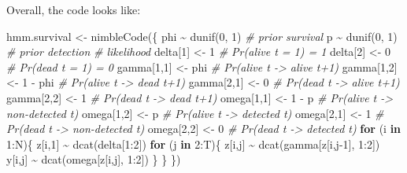 \documentclass[
  12pt,
]{krantz}
\newenvironment{Shaded}{\begin{snugshade}}{\end{snugshade}}
\newcommand{\CommentTok}[1]{\textcolor[rgb]{0.56,0.35,0.01}{\textit{#1}}}
\newcommand{\ControlFlowTok}[1]{\textcolor[rgb]{0.13,0.29,0.53}{\textbf{#1}}}
\newcommand{\DecValTok}[1]{\textcolor[rgb]{0.00,0.00,0.81}{#1}}
\newcommand{\FunctionTok}[1]{\textcolor[rgb]{0.00,0.00,0.00}{#1}}
\newcommand{\NormalTok}[1]{#1}
\newcommand{\OtherTok}[1]{\textcolor[rgb]{0.56,0.35,0.01}{#1}}
\newcommand{\SpecialCharTok}[1]{\textcolor[rgb]{0.00,0.00,0.00}{#1}}
\begin{document}
Overall, the code looks like:

\begin{Shaded}
\begin{Highlighting}[]
\NormalTok{hmm.survival }\OtherTok{\textless{}{-}} \FunctionTok{nimbleCode}\NormalTok{(\{}
\NormalTok{  phi }\SpecialCharTok{\textasciitilde{}} \FunctionTok{dunif}\NormalTok{(}\DecValTok{0}\NormalTok{, }\DecValTok{1}\NormalTok{) }\CommentTok{\# prior survival}
\NormalTok{  p }\SpecialCharTok{\textasciitilde{}} \FunctionTok{dunif}\NormalTok{(}\DecValTok{0}\NormalTok{, }\DecValTok{1}\NormalTok{) }\CommentTok{\# prior detection}
  \CommentTok{\# likelihood}
\NormalTok{  delta[}\DecValTok{1}\NormalTok{] }\OtherTok{\textless{}{-}} \DecValTok{1}          \CommentTok{\# Pr(alive t = 1) = 1}
\NormalTok{  delta[}\DecValTok{2}\NormalTok{] }\OtherTok{\textless{}{-}} \DecValTok{0}          \CommentTok{\# Pr(dead t = 1) = 0}
\NormalTok{  gamma[}\DecValTok{1}\NormalTok{,}\DecValTok{1}\NormalTok{] }\OtherTok{\textless{}{-}}\NormalTok{ phi      }\CommentTok{\# Pr(alive t {-}\textgreater{} alive t+1)}
\NormalTok{  gamma[}\DecValTok{1}\NormalTok{,}\DecValTok{2}\NormalTok{] }\OtherTok{\textless{}{-}} \DecValTok{1} \SpecialCharTok{{-}}\NormalTok{ phi  }\CommentTok{\# Pr(alive t {-}\textgreater{} dead t+1)}
\NormalTok{  gamma[}\DecValTok{2}\NormalTok{,}\DecValTok{1}\NormalTok{] }\OtherTok{\textless{}{-}} \DecValTok{0}        \CommentTok{\# Pr(dead t {-}\textgreater{} alive t+1)}
\NormalTok{  gamma[}\DecValTok{2}\NormalTok{,}\DecValTok{2}\NormalTok{] }\OtherTok{\textless{}{-}} \DecValTok{1}        \CommentTok{\# Pr(dead t {-}\textgreater{} dead t+1)}
\NormalTok{  omega[}\DecValTok{1}\NormalTok{,}\DecValTok{1}\NormalTok{] }\OtherTok{\textless{}{-}} \DecValTok{1} \SpecialCharTok{{-}}\NormalTok{ p    }\CommentTok{\# Pr(alive t {-}\textgreater{} non{-}detected t)}
\NormalTok{  omega[}\DecValTok{1}\NormalTok{,}\DecValTok{2}\NormalTok{] }\OtherTok{\textless{}{-}}\NormalTok{ p        }\CommentTok{\# Pr(alive t {-}\textgreater{} detected t)}
\NormalTok{  omega[}\DecValTok{2}\NormalTok{,}\DecValTok{1}\NormalTok{] }\OtherTok{\textless{}{-}} \DecValTok{1}        \CommentTok{\# Pr(dead t {-}\textgreater{} non{-}detected t)}
\NormalTok{  omega[}\DecValTok{2}\NormalTok{,}\DecValTok{2}\NormalTok{] }\OtherTok{\textless{}{-}} \DecValTok{0}        \CommentTok{\# Pr(dead t {-}\textgreater{} detected t)}
  \ControlFlowTok{for}\NormalTok{ (i }\ControlFlowTok{in} \DecValTok{1}\SpecialCharTok{:}\NormalTok{N)\{}
\NormalTok{    z[i,}\DecValTok{1}\NormalTok{] }\SpecialCharTok{\textasciitilde{}} \FunctionTok{dcat}\NormalTok{(delta[}\DecValTok{1}\SpecialCharTok{:}\DecValTok{2}\NormalTok{])}
    \ControlFlowTok{for}\NormalTok{ (j }\ControlFlowTok{in} \DecValTok{2}\SpecialCharTok{:}\NormalTok{T)\{}
\NormalTok{      z[i,j] }\SpecialCharTok{\textasciitilde{}} \FunctionTok{dcat}\NormalTok{(gamma[z[i,j}\DecValTok{{-}1}\NormalTok{], }\DecValTok{1}\SpecialCharTok{:}\DecValTok{2}\NormalTok{])}
\NormalTok{      y[i,j] }\SpecialCharTok{\textasciitilde{}} \FunctionTok{dcat}\NormalTok{(omega[z[i,j], }\DecValTok{1}\SpecialCharTok{:}\DecValTok{2}\NormalTok{])}
\NormalTok{    \}}
\NormalTok{  \}}
\NormalTok{\})}
\end{Highlighting}
\end{Shaded}
\end{document}
